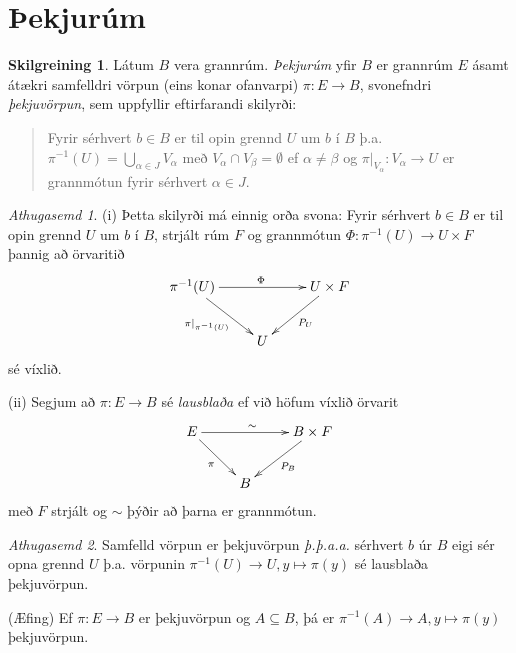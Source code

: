 \documentclass[a4paper,icelandic]{book}
\theoremstyle{definition}
\newtheorem{skilgr}{Skilgreining}[section]
\theoremstyle{plain}
\theoremstyle{remark}
\newtheorem*{ath}{Athugasemd}
\begin{document}
\section{Þekjurúm}
\begin{skilgr}
  Látum $B$ vera grannrúm. \emph{Þekjurúm} yfir
  $B$ er grannrúm $E$ ásamt átækri samfelldri vörpun (eins konar
  ofanvarpi) $\pi:E\to B$, svonefndri
  \emph{þekjuvörpun}, sem uppfyllir
  eftirfarandi skilyrði:
  \begin{quote}
    Fyrir sérhvert $b\in B$ er til opin grennd $U$ um $b$ í $B$ þ.a.
    $\pi^{-1}(U)=\bigcup_{\alpha\in J}V_\alpha$ með $V_\alpha\cap
    V_\beta = \emptyset$ ef $\alpha\neq\beta$ og
    $\pi|_{V_\alpha}:V_\alpha\to U$ er grannmótun fyrir sérhvert
    $\alpha\in J$. 
  \end{quote}
\end{skilgr}
\begin{ath}
  (i) Þetta skilyrði má einnig orða svona: Fyrir sérhvert $b\in B$ er til
  opin grennd $U$ um $b$ í $B$, strjált rúm $F$ og grannmótun
  $\Phi:\pi^{-1}(U)\to U\times F$ þannig að örvaritið 
  \[\xymatrix{
  \pi^{-1}(U)\ar[rr]^{\Phi}\ar[dr]_{\pi|_{\pi^{-1}(U)}}
  &&
  U\times F\ar[dl]^{P_U}
  \\
  & U &
  }\]
  sé víxlið.

  (ii) Segjum að $\pi: E\to B$ sé \emph{lausblaða} ef við höfum víxlið örvarit \[\xymatrix{
  E\ar[rr]^\sim\ar[dr]_\pi
  && B\times F\ar[dl]^{P_B}
  \\
  & B &
  }\]
  með $F$ strjált og $\sim$ þýðir að þarna er grannmótun.
\end{ath}
\begin{ath}
  Samfelld vörpun er þekjuvörpun \emph{þ.þ.a.a.} sérhvert $b$ úr $B$
  eigi sér opna grennd $U$ þ.a. vörpunin $\pi^{-1}(U)\to U, y\mapsto
  \pi(y)$ sé lausblaða þekjuvörpun.

  (Æfing) Ef $\pi:E\to B$ er þekjuvörpun og $A\subseteq B$, þá er
  $\pi^{-1}(A)\to A, y\mapsto \pi(y)$ þekjuvörpun.
\end{ath}
\end{document}
